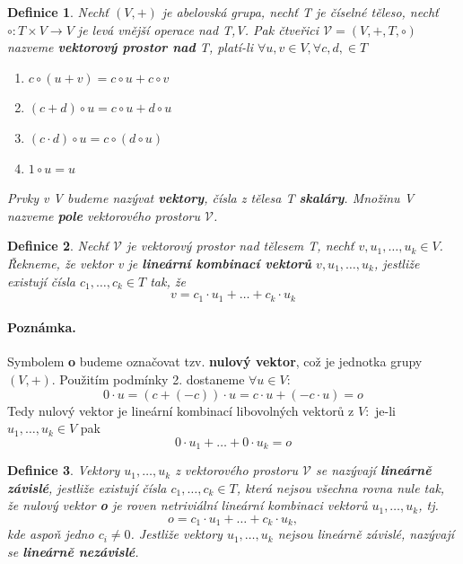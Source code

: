 \documentclass[12pt,a4paper]{article}
\newtheorem{definition}{Definice}
\begin{document}
\begin{definition}
	Nechť $(V, +)$ je abelovská grupa, nechť T je číselné těleso, nechť $\circ : T \times V \rightarrow V$ je levá vnější operace nad T,V. Pak čtveřici $\mathscr{V} = (V, +, T, \circ)$ nazveme \textbf{vektorový prostor nad} T, platí-li $\forall u,v \in V, \forall c,d, \in T$
	\begin{enumerate}
		\item $c \circ (u + v) = c \circ u + c \circ v$
		\item $(c + d) \circ u = c \circ u + d \circ u$
		\item $(c \cdot d) \circ u = c \circ (d \circ u)$
		\item $1 \circ u = u$
	\end{enumerate}
	Prvky v V budeme nazývat \textbf{vektory}, čísla z tělesa T \textbf{skaláry}. Množinu V nazveme \textbf{pole} vektorového prostoru $\mathscr{V}$.
\end{definition}

\begin{definition}
	Nechť  $\mathscr{V}$ je vektorový prostor nad tělesem T, nechť $v,u_1,\dots,u_k \in V$. Řekneme, že vektor v je \textbf{lineární kombinací vektorů}  $v,u_1,\dots,u_k$, jestliže existují čísla $c_1, \dots, c_k \in T$ tak, že $$v = c_1 \cdot u_1 + \dots + c_k \cdot u_k$$
\end{definition}
\paragraph{Poznámka.} Symbolem \textbf{o} budeme označovat tzv. \textbf{nulový vektor}, což je jednotka grupy $(V, +)$. Použitím podmínky 2. dostaneme $\forall u \in V:$ $$0 \cdot u = (c + (-c)) \cdot u = c \cdot u + (-c \cdot u) = o$$
Tedy nulový vektor je lineární kombinací libovolných vektorů z $V: $ je-li $u_1,\dots,u_k \in V$ pak $$0 \cdot u_1 + \dots + 0 \cdot u_k = o$$


\begin{definition}
	Vektory $u_1, \dots, u_k$ z vektorového prostoru $\mathscr{V}$ se nazývají \textbf{lineárně závislé}, jestliže existují čísla $c_1, \dots, c_k \in T$, která nejsou všechna rovna nule tak, že nulový vektor \textbf{o} je roven netriviální lineární kombinaci vektorů $u_1, \dots, u_k$, tj. $$o = c_1 \cdot u_1 + \dots + c_k \cdot u_k,$$
	kde aspoň jedno $c_i \not= 0$. Jestliže vektory $u_1, \dots, u_k$ nejsou lineárně závislé, nazývají se \textbf{lineárně nezávislé}.
\end{definition}
\end{document}
